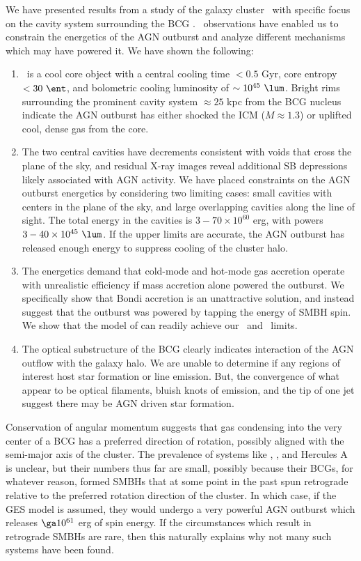 \documentclass{emulateapj}
\begin{document}
We have presented results from a study of the galaxy cluster
\rxj\ with specific focus on the cavity system surrounding the BCG
\rbs. \cxo\ observations have enabled us to constrain the energetics
of the AGN outburst and analyze different mechanisms which may have
powered it. We have shown the following:
\begin{enumerate}
\item \rxj\ is a cool core object with a central cooling time $< 0.5$
  Gyr, core entropy $< 30 ~\ent$, and bolometric cooling luminosity of
  $\sim 10^{45} ~\lum$. Bright rims surrounding the prominent cavity
  system $\approx 25$ kpc from the BCG nucleus indicate the AGN
  outburst has either shocked the ICM ($M \approx 1.3$) or uplifted
  cool, dense gas from the core.
\item The two central cavities have decrements consistent with voids
  that cross the plane of the sky, and residual X-ray images reveal
  additional SB depressions likely associated with AGN activity. We
  have placed constraints on the AGN outburst energetics by
  considering two limiting cases: small cavities with centers in the
  plane of the sky, and large overlapping cavities along the line of
  sight. The total energy in the cavities is $3-70 \times 10^{60}$
  erg, with powers $3-40 \times 10^{45} ~\lum$. If the upper limits
  are accurate, the AGN outburst has released enough energy to
  suppress cooling of the cluster halo.
\item The energetics demand that cold-mode and hot-mode gas accretion
  operate with unrealistic efficiency if mass accretion alone powered
  the outburst. We specifically show that Bondi accretion is an
  unattractive solution, and instead suggest that the outburst was
  powered by tapping the energy of SMBH spin. We show that the model
  of \citet{gesspin} can readily achieve our \ecav\ and \pcav\ limits.
\item The optical substructure of the BCG clearly indicates
  interaction of the AGN outflow with the galaxy halo. We are unable
  to determine if any regions of interest host star formation or line
  emission. But, the convergence of what appear to be optical
  filaments, bluish knots of emission, and the tip of one jet suggest
  there may be AGN driven star formation.
\end{enumerate}

Conservation of angular momentum suggests that gas condensing into the
very center of a BCG has a preferred direction of rotation, possibly
aligned with the semi-major axis of the cluster. The prevalence of
systems like \rbs, \ms, and Hercules A is unclear, but their numbers
thus far are small, possibly because their BCGs, for whatever reason,
formed SMBHs that at some point in the past spun retrograde relative
to the preferred rotation direction of the cluster. In which case, if
the GES model is assumed, they would undergo a very powerful AGN
outburst which releases $\ga 10^{61}$ erg of spin energy. If the
circumstances which result in retrograde SMBHs are rare, then this
naturally explains why not many such systems have been
found.
\end{document}
